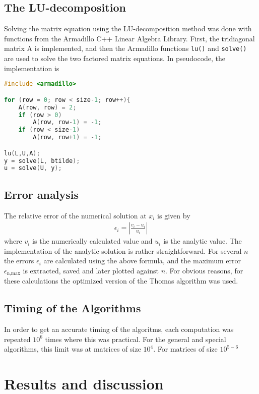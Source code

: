 \documentclass[aps,prl,reprint,toc]{revtex4-1}
\begin{document}
\subsection{The LU-decomposition}
Solving the matrix equation using the LU-decomposition method was done with
functions from the Armadillo C++ Linear Algebra Library. First, the tridiagonal
matrix A is implemented, and then the Armadillo functions \texttt{lu()} and \texttt{solve()}
are used to solve the two factored matrix equations. In pseudocode, the implementation is
\begin{lstlisting}[language=cpp, caption={Pseudocode of LU-decomposition method implementation}]
#include <armadillo>

for (row = 0; row < size-1; row++){
    A(row, row) = 2;
    if (row > 0)
        A(row, row-1) = -1;
    if (row < size-1)
        A(row, row+1) = -1;

lu(L,U,A);
y = solve(L, btilde);
u = solve(U, y);
\end{lstlisting}
\subsection{Error analysis}
The relative error of the numerical solution at $x_i$ is given by
\begin{align*}
  \epsilon_i = \left| \frac{v_i - u_i}{u_i} \right|
\end{align*}
where $v_i$ is the numerically calculated value and $u_i$ is the analytic value.
The implementation of the analytic solution is rather straightforward. For several
$n$ the errors $\epsilon_i$ are calculated using the above formula, and the
maximum error $\epsilon_\text{n,max}$ is extracted, saved and later plotted against $n$.
For obvious reasons, for these calculations the optimized version of the Thomas algorithm was used.

\subsection{Timing of the Algorithms}
\label{sec:timingmethod}
In order to get an accurate timing of the algoritms, each computation was
repeated \(10^6\) times where this was practical. For the general and special
algorithms, this limit was at matrices of size \(10^4\). For matrices of size \(10^{5-6}\) 

\section{Results and discussion}
\end{document}
